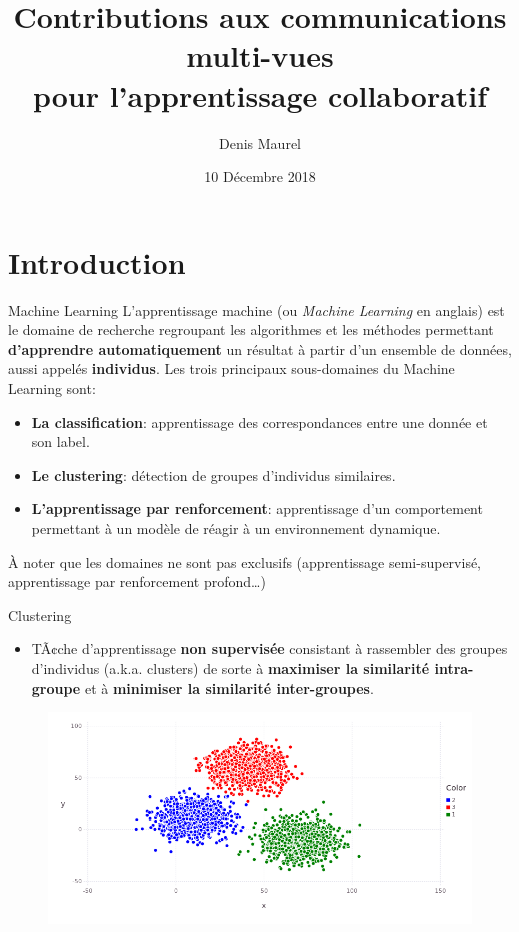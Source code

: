 \documentclass[hyperref={pdfpagelabels=false}]{beamer}
\title{Contributions aux communications multi-vues\\pour l'apprentissage collaboratif}
\date{10 Décembre 2018}
\author{Denis Maurel}
\begin{document}
    \maketitle

    \section{Introduction}
    \begin{frame}{Machine Learning}
        L'apprentissage machine (ou \textit{Machine Learning} en anglais) est le 
        domaine de recherche regroupant les algorithmes et les méthodes 
        permettant \textbf{d'apprendre automatiquement} un résultat à partir 
        d'un ensemble de données, aussi appelés \textbf{individus}.
        Les trois principaux sous-domaines du Machine Learning sont:
        \begin{itemize}
            \item<2-> {\textbf{La classification}: 
                    apprentissage des correspondances entre une donnée et son 
                label.}
            \item<3-> \textbf{Le clustering}: détection de groupes d'individus 
                similaires.
            \item<4-> {\textbf{L'apprentissage par 
                renforcement}: apprentissage d'un comportement permettant à un 
            modèle de réagir à un environnement dynamique.}
        \end{itemize}
        À noter que les domaines ne sont pas exclusifs (apprentissage 
        semi-supervisé, apprentissage par renforcement profond\ldots)
    \end{frame}

    \begin{frame}{Clustering}
        \begin{itemize}
            \item TÃ¢che d'apprentissage \textbf{non supervisée} consistant à 
                rassembler des groupes d'individus (a.k.a. clusters) de sorte à 
                \textbf{maximiser la similarité intra-groupe} et à 
                \textbf{minimiser la similarité inter-groupes}.
        \end{itemize}

        \begin{figure}[b]
            \centering
            \includegraphics[scale=.25]{clustering}
        \end{figure}
    \end{frame}
\end{document}
